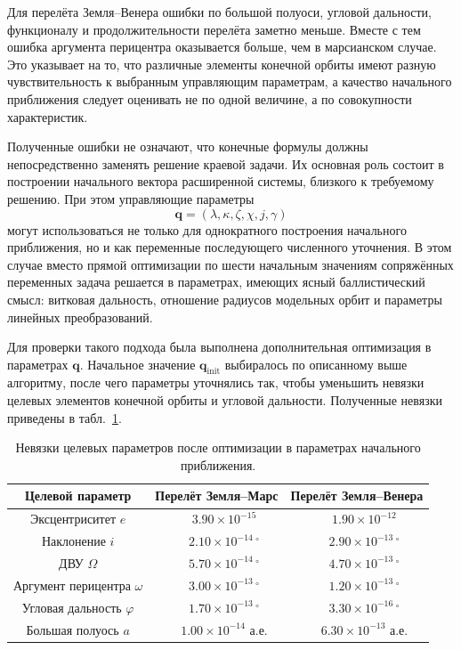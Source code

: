 Для перелёта Земля--Венера ошибки по большой полуоси, угловой дальности, функционалу и продолжительности перелёта заметно меньше. Вместе с тем ошибка аргумента перицентра оказывается больше, чем в марсианском случае. Это указывает на то, что различные элементы конечной орбиты имеют разную чувствительность к выбранным управляющим параметрам, а качество начального приближения следует оценивать не по одной величине, а по совокупности характеристик.

Полученные ошибки не означают, что конечные формулы должны непосредственно заменять решение краевой задачи. Их основная роль состоит в построении начального вектора расширенной системы, близкого к требуемому решению. При этом управляющие параметры
\begin{equation}
\mathbf q=(\lambda,\kappa,\zeta,\chi,j,\gamma)
\end{equation}
могут использоваться не только для однократного построения начального приближения, но и как переменные последующего численного уточнения. В этом случае вместо прямой оптимизации по шести начальным значениям сопряжённых переменных задача решается в параметрах, имеющих ясный баллистический смысл: витковая дальность, отношение радиусов модельных орбит и параметры линейных преобразований.

Для проверки такого подхода была выполнена дополнительная оптимизация в параметрах \(\mathbf q\). Начальное значение \(\mathbf q_{\mathrm{init}}\) выбиралось по описанному выше алгоритму, после чего параметры уточнялись так, чтобы уменьшить невязки целевых элементов конечной орбиты и угловой дальности. Полученные невязки приведены в табл.~\ref{tab:chap4_q_optimization_residuals}.

\begin{table}[htbp]
	\centering
	\caption{Невязки целевых параметров после оптимизации в параметрах начального приближения.}
	\label{tab:chap4_q_optimization_residuals}
	\begin{tabular}{ccc}
		\toprule
		Целевой параметр &
		Перелёт Земля--Марс &
		Перелёт Земля--Венера \\
		\midrule
		Эксцентриситет \(e\) &
		\(\phantom{-}3.90\times10^{-15}\) &
		\(\phantom{-}1.90\times10^{-12}\) \\
		Наклонение \(i\) &
		\(\phantom{-}2.10\times10^{-14}\,{}^\circ\) &
		\(\phantom{-}2.90\times10^{-13}\,{}^\circ\) \\
		ДВУ \(\Omega\) &
		\(\phantom{-}5.70\times10^{-14}\,{}^\circ\) &
		\(\phantom{-}4.70\times10^{-13}\,{}^\circ\) \\
		Аргумент перицентра \(\omega\) &
		\(\phantom{-}3.00\times10^{-13}\,{}^\circ\) &
		\(\phantom{-}1.20\times10^{-13}\,{}^\circ\) \\
		Угловая дальность \(\varphi\) &
		\(\phantom{-}1.70\times10^{-13}\,{}^\circ\) &
		\(\phantom{-}3.30\times10^{-16}\,{}^\circ\) \\
		Большая полуось \(a\) &
		\(\phantom{-}1.00\times10^{-14}\) а.е. &
		\(\phantom{-}6.30\times10^{-13}\) а.е. \\
		\bottomrule
	\end{tabular}
\end{table}

